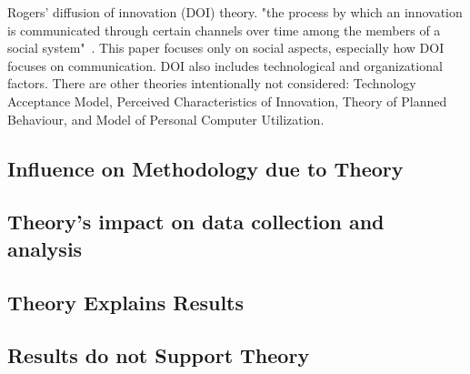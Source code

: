 \documentclass[journal,12pt,onecolumn,]{IEEEtran}
\begin{document}
Rogers' diffusion of innovation (DOI) theory.
"the process by which an innovation is communicated through certain channels over time among the members of a social system"~\cite{rogers1995attributes}.
This paper focuses only on social aspects, especially how DOI focuses on communication.
DOI also includes technological and organizational factors.
There are other theories intentionally not considered: Technology Acceptance Model, Perceived Characteristics of Innovation, Theory of Planned Behaviour, and Model of Personal Computer Utilization.


\subsection{Influence on Methodology due to Theory}

\subsection{Theory's impact on data collection and analysis}

\subsection{Theory Explains Results}
\subsection{Results do not Support Theory} %



\end{document}
